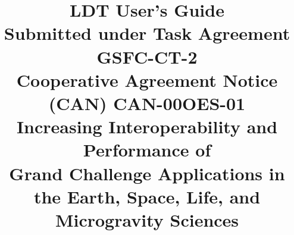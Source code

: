 \title{{\bf LDT User's Guide} \\
\nextpar
\normalsize Submitted under Task Agreement GSFC-CT-2 \\
\nextpar
\normalsize Cooperative Agreement Notice (CAN) CAN-00OES-01 \\
\nextpar
\normalsize Increasing Interoperability and Performance of \\
Grand Challenge Applications in the Earth, 
Space, Life, and Microgravity Sciences \\
}

